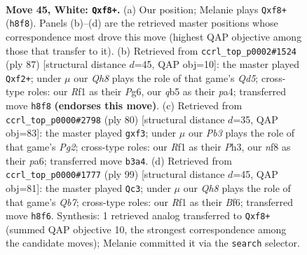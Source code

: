 \documentclass[11pt]{article}
\begin{document}
\clearpage

\begin{figure}[p]\centering
\begin{subfigure}{0.46\textwidth}\centering
\resizebox{\linewidth}{!}{%
\newchessgame
\chessboard[
  setfen={4kn1Q/8/8/1qp5/p7/1P6/P7/5RK1 w - - 0 45},
  showmover=false,
  pgfstyle=straightmove, color=movearrow, markmove={h8-f8}
]}
\caption{}
\end{subfigure}\hfill
\begin{subfigure}{0.46\textwidth}\centering
\resizebox{\linewidth}{!}{%
\newchessgame
\chessboard[
  setfen={8/5k2/p5p1/7p/PP1q4/6P1/5Q2/6K1 b - - 2 44},
  showmover=false,
  pgfstyle=straightmove, color=movearrow, markmove={d4-f2}
]}
\caption{}
\end{subfigure}
\\[4pt]
\begin{subfigure}{0.46\textwidth}\centering
\resizebox{\linewidth}{!}{%
\newchessgame
\chessboard[
  setfen={8/Q7/p7/6p1/8/P1P2pqP/6P1/k6K w - - 0 41},
  showmover=false,
  pgfstyle=straightmove, color=movearrow, markmove={g2-f3}
]}
\caption{}
\end{subfigure}\hfill
\begin{subfigure}{0.46\textwidth}\centering
\resizebox{\linewidth}{!}{%
\newchessgame
\chessboard[
  setfen={6k1/p1P5/4pbp1/7P/P4Q2/8/1q1NK3/8 b - - 0 50},
  showmover=false,
  pgfstyle=straightmove, color=movearrow, markmove={b2-c3}
]}
\caption{}
\end{subfigure}
\caption{\textbf{Move 45, White: \texttt{Qxf8+}.} (a) Our position; Melanie plays \texttt{Qxf8+} (\texttt{h8f8}). Panels (b)--(d) are the retrieved master positions whose correspondence most drove this move (highest QAP objective among those that transfer to it). (b) Retrieved from \texttt{ccrl\_top\_p0002\#1524} (ply 87) [structural distance $d$=45, QAP obj=10]: the master played \texttt{Qxf2+}; under $\mu$ our \emph{Qh8} plays the role of that game's \emph{Qd5}; cross-type roles: our \emph{R}f1 as their \emph{P}g6, our \emph{q}b5 as their \emph{p}a4; transferred move \texttt{h8f8} \textbf{(endorses this move)}. (c) Retrieved from \texttt{ccrl\_top\_p0000\#2798} (ply 80) [structural distance $d$=35, QAP obj=83]: the master played \texttt{gxf3}; under $\mu$ our \emph{Pb3} plays the role of that game's \emph{Pg2}; cross-type roles: our \emph{R}f1 as their \emph{P}h3, our \emph{n}f8 as their \emph{p}a6; transferred move \texttt{b3a4}. (d) Retrieved from \texttt{ccrl\_top\_p0000\#1777} (ply 99) [structural distance $d$=45, QAP obj=81]: the master played \texttt{Qc3}; under $\mu$ our \emph{Qh8} plays the role of that game's \emph{Qb7}; cross-type roles: our \emph{R}f1 as their \emph{B}f6; transferred move \texttt{h8f6}. Synthesis: 1 retrieved analog transferred to \texttt{Qxf8+} (summed QAP objective 10, the strongest correspondence among the candidate moves); Melanie committed it via the \texttt{search} selector.}
\label{fig:thought-m88}
\end{figure}
\end{document}
